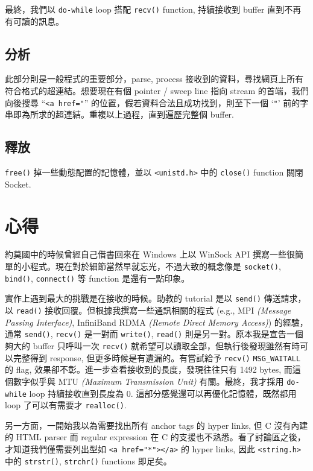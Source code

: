 \documentclass[12pt, a4paper]{article}
\begin{document}
最終，我們以 \texttt{do-while} loop 搭配 \texttt{recv()} function, 持續接收到 buffer 直到不再有可讀的訊息。

\subsection{分析}

此部分則是一般程式的重要部分，parse, process 接收到的資料，尋找網頁上所有符合格式的超連結。想要現在有個 pointer / sweep line 指向 stream 的首端，我們向後搜尋 ``\texttt{<a href="}'' 的位置，假若資料合法且成功找到，則至下一個 `\texttt{"}' 前的字串即為所求的超連結。重複以上過程，直到遍歷完整個 buffer.

\subsection{釋放}

\texttt{free()} 掉一些動態配置的記憶體，並以 \texttt{<unistd.h>} 中的 \texttt{close()} function 關閉 \textsf{Socket}.

\section{心得}

約莫國中的時候曾經自己借書回來在 Windows 上以 \textsf{WinSock} API 撰寫一些很簡單的小程式。現在對於細節當然早就忘光，不過大致的概念像是 \texttt{socket()}, \texttt{bind()}, \texttt{connect()} 等 function 是還有一點印象。

實作上遇到最大的挑戰是在接收的時候。助教的 tutorial 是以 \texttt{send()} 傳送請求，以 \texttt{read()} 接收回覆。但根據我撰寫一些通訊相關的程式 (e.g., MPI \textit{(Message Passing Interface)}, \textsf{InfiniBand} RDMA \textit{(Remote Direct Memory Access)}) 的經驗，通常 \texttt{send()}, \texttt{recv()} 是一對而 \texttt{write()}, \texttt{read()} 則是另一對。原本我是宣告一個夠大的 buffer 只呼叫一次 \texttt{recv()} 就希望可以讀取全部，但執行後發現雖然有時可以完整得到 response, 但更多時候是有遺漏的。有嘗試給予 \texttt{recv()} \texttt{MSG\_WAITALL} 的 flag, 效果卻不彰。進一步查看接收到的長度，發現往往只有 1492 bytes, 而這個數字似乎與 MTU \textit{(Maximum Transmission Unit)} 有關。最終，我才採用 \texttt{do-while} loop 持續接收直到長度為 0. 這部分感覺還可以再優化記憶體，既然都用 loop 了可以有需要才 \texttt{realloc()}.

另一方面，一開始我以為需要找出所有 anchor tags 的 hyper links, 但 C 沒有內建的 \textsf{HTML} parser 而 \textsf{regular expression} 在 C 的支援也不熟悉。看了討論區之後，才知道我們僅需要列出型如 \texttt{<a href="*"></a>} 的 hyper links, 因此 \texttt{<string.h>} 中的 \texttt{strstr()}, \texttt{strchr()} functions 即足矣。
\end{document}
